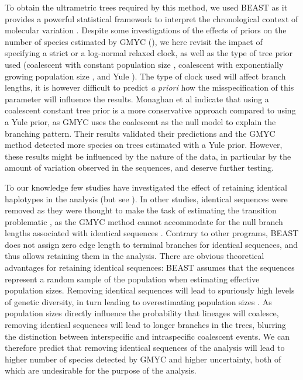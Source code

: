 \documentclass[12pt,letterpaper]{article}\usepackage[]{graphicx}\usepackage[]{color}
\begin{document}
To obtain the ultrametric trees required by this method, we used BEAST as it
provides a powerful statistical framework to interpret the chronological context
of molecular variation \citep{Drummond2014}. Despite some investigations of the
effects of priors on the number of species estimated by GMYC
(\citep{Monaghan2009, Fujisawa2013, Talavera2013}), we here revisit the impact of
specifying a strict or a log-normal relaxed clock, as well as the type of tree
prior used (coalescent with constant population size \citep{Kingman1982},
coalescent with exponentially growing population size \citep{Griffiths1994}, and
Yule \citep{Yule1925}). The type of clock used will affect branch lengths, it is
however difficult to predict \textit{a priori} how the misspecification of this
parameter will influence the results. Monaghan et al \citep{Monaghan2009}
indicate that using a coalescent constant tree prior is a more conservative
approach compared to using a Yule prior, as GMYC uses the coalescent as the null
model to explain the branching pattern. Their results validated their
predictions and the GMYC method detected more species on trees estimated with a
Yule prior. However, these results might be influenced by the nature of the
data, in particular by the amount of variation observed in the sequences, and
deserve further testing.

To our knowledge few studies have investigated the effect of retaining identical
haplotypes in the analysis (but see \citep{Talavera2013}). In other studies,
identical sequences were removed as they were thought to make the task of
estimating the transition problematic \citep{Monaghan2009}, as the GMYC method
cannot accommodate for the null branch lengths associated with identical
sequences \citep{Fujisawa2013}. Contrary to other programs, BEAST does not assign
zero edge length to terminal branches for identical sequences, and thus allows
retaining them in the analysis. There are obvious theoretical advantages for
retaining identical sequences: BEAST assumes that the sequences represent a
random sample of the population when estimating effective population
sizes. Removing identical sequences will lead to spuriously high levels of
genetic diversity, in turn leading to overestimating population sizes
\cite[p.98]{Drummond2014}. As population sizes directly influence the
probability that lineages will coalesce, removing identical sequences will lead
to longer branches in the trees, blurring the distinction between interspecific
and intraspecific coalescent events. We can therefore predict that removing
identical sequences of the analysis will lead to higher number of species
detected by GMYC and higher uncertainty, both of which are undesirable for the
purpose of the analysis.
\end{document}
